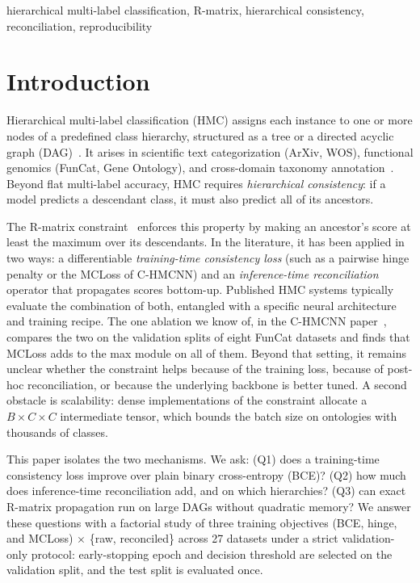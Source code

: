 \documentclass[conference]{IEEEtran}
\begin{document}
\begin{IEEEkeywords}
hierarchical multi-label classification, R-matrix, hierarchical consistency,
reconciliation, reproducibility
\end{IEEEkeywords}

\section{Introduction}
\label{sec:intro}

Hierarchical multi-label classification (HMC) assigns each instance to one or
more nodes of a predefined class hierarchy, structured as a tree or a directed
acyclic graph (DAG)~\cite{silla2011hmc}. It arises in scientific text
categorization (ArXiv, WOS), functional genomics (FunCat, Gene Ontology), and
cross-domain taxonomy annotation~\cite{clus,cerri2014hmc}. Beyond flat
multi-label accuracy, HMC requires \emph{hierarchical consistency}: if a model
predicts a descendant class, it must also predict all of its ancestors.

The R-matrix constraint~\cite{chmcnn} enforces this property by making an
ancestor's score at least the maximum over its descendants. In the literature,
it has been applied in two ways: a differentiable \emph{training-time
consistency loss} (such as a pairwise hinge penalty or the MCLoss of C-HMCNN)
and an \emph{inference-time reconciliation} operator that propagates scores
bottom-up. Published HMC systems typically evaluate the combination of both,
entangled with a specific neural architecture and training recipe. The one
ablation we know of, in the C-HMCNN paper~\cite{chmcnn}, compares the two on
the validation splits of eight FunCat datasets and finds that MCLoss adds to
the max module on all of them. Beyond that setting, it remains unclear whether
the constraint helps because of the training loss, because of post-hoc
reconciliation, or because the underlying backbone is better tuned. A second obstacle is scalability: dense implementations of the
constraint allocate a $B\times C\times C$ intermediate tensor, which bounds the
batch size on ontologies with thousands of classes.

This paper isolates the two mechanisms. We ask: (Q1) does a training-time
consistency loss improve over plain binary cross-entropy (BCE)? (Q2) how much
does inference-time reconciliation add, and on which hierarchies? (Q3) can
exact R-matrix propagation run on large DAGs without quadratic memory? We answer
these questions with a factorial study of three training objectives (BCE,
hinge, and MCLoss) $\times$ \{raw, reconciled\} across 27 datasets under a
strict validation-only protocol: early-stopping epoch and decision threshold
are selected on the validation split, and the test split is evaluated once.
\end{document}

